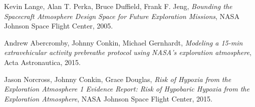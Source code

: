 \documentclass{article}
\begin{document}
\begin{thebibliography}{9}

    Kevin Lange, Alan T. Perka, Bruce Duffield, Frank F. Jeng,
    \textit{Bounding the Spacecraft Atmosphere Design Space for Future Exploration Missions},
    NASA Johnson Space Flight Center,
    2005.

    Andrew Abercromby, Johnny Conkin, Michael Gernhardt,
    \textit{Modeling a 15-min extravehicular activity prebreathe protocol using NASA's exploration atmosphere},
    Acta Astronautica,
    2015.

    Jason Norcross, Johnny Conkin, Grace Douglas,
    \textit{Risk of Hypoxia from the Exploration Atmosphere 1 Evidence Report: Risk of Hypobaric Hypoxia from the Exploration Atmosphere},
    NASA Johnson Space Flight Center,
    2015.

\end{thebibliography}
\end{document}
